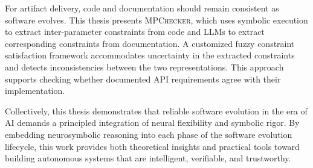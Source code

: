 \documentclass[12pt,a4paper]{Thesis} %
\newcommand{\toolchecker}{\textsc{MPChecker}\xspace}
\begin{document}
For artifact delivery, code and documentation should remain consistent as software evolves. This thesis presents \toolchecker, which uses symbolic execution to extract inter-parameter constraints from code and LLMs to extract corresponding constraints from documentation. A customized fuzzy constraint satisfaction framework accommodates uncertainty in the extracted constraints and detects inconsistencies between the two representations. This approach supports checking whether documented API requirements agree with their implementation.

Collectively, this thesis demonstrates that reliable software evolution in the era of AI demands a principled integration of neural flexibility and symbolic rigor. By embedding neurosymbolic reasoning into each phase of the software evolution lifecycle, this work provides both theoretical insights and practical tools toward building autonomous systems that are intelligent, verifiable, and trustworthy.


\pagestyle{fancy} %

\tableofcontents %

\listoffigures %

\listoftables %



%
%

\end{document}
